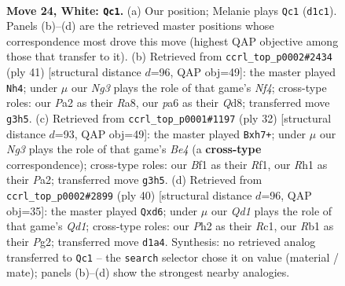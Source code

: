 \documentclass[11pt]{article}
\begin{document}
\clearpage

\begin{figure}[p]\centering
\begin{subfigure}{0.46\textwidth}\centering
\resizebox{\linewidth}{!}{%
\newchessgame
\chessboard[
  setfen={r1b2kr1/1p2bp1p/p5p1/2Bp4/5q2/3K1PN1/PP4PP/1R1Q1B1R w - - 1 24},
  showmover=false,
  pgfstyle=straightmove, color=movearrow, markmove={d1-c1}
]}
\caption{}
\end{subfigure}\hfill
\begin{subfigure}{0.46\textwidth}\centering
\resizebox{\linewidth}{!}{%
\newchessgame
\chessboard[
  setfen={r2qr1k1/p4pb1/1p4pp/3pBn2/3P4/1P1Q1B1P/P4PP1/2R1R1K1 b - - 5 21},
  showmover=false,
  pgfstyle=straightmove, color=movearrow, markmove={f5-h4}
]}
\caption{}
\end{subfigure}
\\[4pt]
\begin{subfigure}{0.46\textwidth}\centering
\resizebox{\linewidth}{!}{%
\newchessgame
\chessboard[
  setfen={r3r1k1/pp3ppp/2p5/7b/3qB3/6PP/PPP2P2/R1B1QRK1 w - - 1 17},
  showmover=false,
  pgfstyle=straightmove, color=movearrow, markmove={e4-h7}
]}
\caption{}
\end{subfigure}\hfill
\begin{subfigure}{0.46\textwidth}\centering
\resizebox{\linewidth}{!}{%
\newchessgame
\chessboard[
  setfen={r1b1r1k1/4Bpb1/pq1p2pp/8/7P/1P2RN2/P4PP1/2RQ2K1 w - - 0 21},
  showmover=false,
  pgfstyle=straightmove, color=movearrow, markmove={d1-d6}
]}
\caption{}
\end{subfigure}
\caption{\textbf{Move 24, White: \texttt{Qc1}.} (a) Our position; Melanie plays \texttt{Qc1} (\texttt{d1c1}). Panels (b)--(d) are the retrieved master positions whose correspondence most drove this move (highest QAP objective among those that transfer to it). (b) Retrieved from \texttt{ccrl\_top\_p0002\#2434} (ply 41) [structural distance $d$=96, QAP obj=49]: the master played \texttt{Nh4}; under $\mu$ our \emph{Ng3} plays the role of that game's \emph{Nf4}; cross-type roles: our \emph{P}a2 as their \emph{R}a8, our \emph{p}a6 as their \emph{Q}d8; transferred move \texttt{g3h5}. (c) Retrieved from \texttt{ccrl\_top\_p0001\#1197} (ply 32) [structural distance $d$=93, QAP obj=49]: the master played \texttt{Bxh7+}; under $\mu$ our \emph{Ng3} plays the role of that game's \emph{Be4} (a \textbf{cross-type} correspondence); cross-type roles: our \emph{B}f1 as their \emph{R}f1, our \emph{R}h1 as their \emph{P}a2; transferred move \texttt{g3h5}. (d) Retrieved from \texttt{ccrl\_top\_p0002\#2899} (ply 40) [structural distance $d$=96, QAP obj=35]: the master played \texttt{Qxd6}; under $\mu$ our \emph{Qd1} plays the role of that game's \emph{Qd1}; cross-type roles: our \emph{P}h2 as their \emph{R}c1, our \emph{R}b1 as their \emph{P}g2; transferred move \texttt{d1a4}. Synthesis: no retrieved analog transferred to \texttt{Qc1} -- the \texttt{search} selector chose it on value (material / mate); panels (b)--(d) show the strongest nearby analogies.}
\label{fig:thought-m46}
\end{figure}
\end{document}
